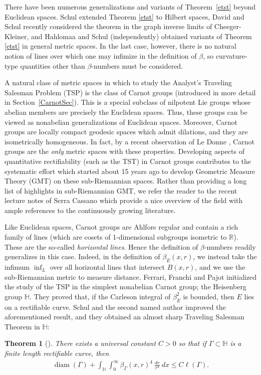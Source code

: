 \documentclass[11pt]{amsart}
\newtheorem{theorem}{Theorem}
\def\diam{{\rm diam\,}}
\theoremstyle{definition}
\newcommand{\Heis}{\mathbb H}
\newcommand{\R}{\mathbb R}
\def\diam{\operatorname{diam}}
\numberwithin{theorem}{section} \numberwithin{equation}{section}
\begin{document}
There have been numerous generalizations and variants of Theorem~\ref{etst} beyond Euclidean spaces. Schul \cite{SchulTSP} extended Theorem \ref{etst} to Hilbert spaces, David and Schul \cite{DavidSchul} recently considered the theorem in the graph inverse limits of Cheeger-Kleiner, and Hahlomaa and Schul (independently)\cite{Hah05, Hah07,Sch07} obtained variants of Theorem \ref{etst} in general metric spaces. In the last case, however, there is no natural notion of lines over which one may infimize in the definition of $\beta$,
so curvature-type quantities other than $\beta$-numbers must be considered. 

A natural class of metric spaces in which to study the Analyst's Traveling Salesman Problem (TSP) is the class of Carnot groups
(introduced in more detail in Section~\ref{CarnotSec}).  
This is a special subclass of nilpotent Lie groups whose abelian members are precisely the Euclidean spaces.  
Thus, these groups can be viewed as nonabelian generalizations of Euclidean spaces. Moreover, Carnot groups are locally compact geodesic spaces which admit dilations, and they are isometrically homogeneous. In fact, by a recent observation of Le Donne \cite{ledo}, Carnot groups are  the {\em only} metric spaces with these properties. 
Developing aspects of quantitative rectifiability (such as the TST) in Carnot groups contributes to the systematic effort which started about 15 years
ago to develop Geometric Measure Theory (GMT) on these sub-Riemannian spaces. Rather than providing a long list of highlights in sub-Riemannian GMT, 
we refer the reader to the recent lecture notes of Serra Cassano \cite{scnotes} which provide a nice overview of the field with ample references to the continuously growing literature. 

Like Euclidean spaces, Carnot groups are Ahlfors regular and contain a rich family of lines 
(which are cosets of 1-dimensional subgroups isometric to $\R$).
These are the so-called {\em horizontal lines}.
Hence the definition of $\beta$-numbers readily generalizes in this case.  
Indeed, in the definition of $\beta_E(x,r)$, we instead take the infimum $\inf_L$ 
over all horizontal lines that intersect $B(x,r)$, 
and we use the sub-Riemannian metric to measure distance. Ferrari, Franchi and Pajot \cite{FFP} initialized the study of the TSP in the simplest nonabelian Carnot group; the Heisenberg group $\Heis$. They proved that, if the Carleson integral of $\beta_E^{2}$ is bounded, then $E$ lies on a rectifiable curve. Schul and the second named  author \cite{LiSchul,LiSchul2}  improved the aforementioned result, and they obtained an almost sharp Traveling Salesman Theorem in $\Heis$:
\begin{theorem}[\cite{LiSchul}] \label{t:H-TSP1}
  There exists a universal constant $C > 0$ so that if $\Gamma \subset \Heis$ is a finite length rectifiable curve, then
  \begin{align*}
    \diam(\Gamma) + \int_\Heis \int_0^\infty \beta_\Gamma(x,r)^4 ~\frac{dr}{r^4} ~dx \leq C \ell(\Gamma).
  \end{align*}
\end{theorem}
\end{document}
